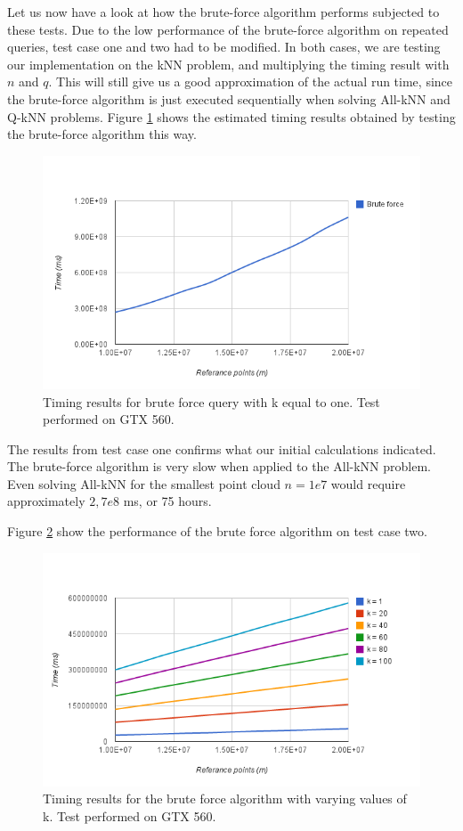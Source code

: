 Let us now have a look at how the brute-force algorithm performs subjected to these tests. Due to the low performance of the brute-force algorithm on repeated queries, test case one and two had to be modified. In both cases, we are testing our implementation on the kNN problem, and multiplying the timing result with $n$ and $q$. This will still give us a good approximation of the actual run time, since the brute-force algorithm is just executed sequentially when solving All-kNN and Q-kNN problems. Figure \ref{fig:brute-force-query} shows the estimated timing results obtained by testing the brute-force algorithm this way.

\begin{figure}[ht!]
    \centering
    \includegraphics[width=120mm]{../gfx/brute-force-query.png}
    \caption{Timing results for brute force query with k equal to one. Test performed on GTX 560.}
    \label{fig:brute-force-query}
\end{figure}

The results from test case one confirms what our initial calculations indicated. The brute-force algorithm is very slow when applied to the All-kNN problem. Even solving All-kNN for the smallest point cloud $n=1e7$ would require approximately $2,7e8$ ms, or 75 hours.

Figure \ref{fig:brute-force-variable-k} show the performance of the brute force algorithm on test case two.

\begin{figure}[ht!]
    \centering
    \includegraphics[width=120mm]{../gfx/brute-force-variable-k.png}
    \caption{Timing results for the brute force algorithm with varying values of k. Test performed on GTX 560.}
    \label{fig:brute-force-variable-k}
\end{figure}

